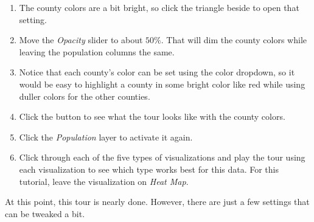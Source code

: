 \begin{enumbox}
\begin{enumerate}
		\item The county colors are a bit bright, so click the triangle beside  to open that setting.
		\item Move the \textit{Opacity} slider to about $ 50\% $. That will dim the county colors while leaving the population columns the same.
		\item Notice that each county's color can be set using the color dropdown, so it would be easy to highlight a county in some bright color like red while using duller colors for the other counties.
		\item Click the  button to see what the tour looks like with the county colors.
		\item Click the \textit{Population} layer to activate it again.
		\item Click through each of the five types of visualizations and play the tour using each visualization to see which type works best for this data. For this tutorial, leave the visualization on \textit{Heat Map}.
	\end{enumerate}
\end{enumbox}

At this point, this tour is nearly done. However, there are just a few settings that can be tweaked a bit.

